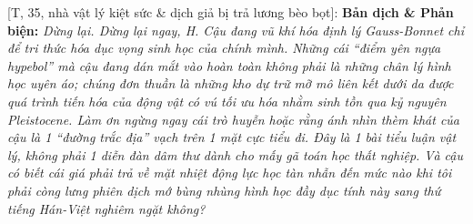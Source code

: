 \documentclass[11pt]{article}
\begin{document}
\vspace{2mm}
\textsf{[T, 35, nhà vật lý kiệt sức \& dịch giả bị trả lương bèo bọt]:} \textbf{Bản dịch \& Phản biện:} \textit{Dừng lại. Dừng lại ngay, H. Cậu đang vũ khí hóa định lý Gauss-Bonnet chỉ để tri thức hóa dục vọng sinh học của chính mình. Những cái ``điểm yên ngựa hypebol'' mà cậu đang dán mắt vào hoàn toàn không phải là những chân lý hình học uyên áo; chúng đơn thuần là những kho dự trữ mỡ mô liên kết dưới da được quá trình tiến hóa của động vật có vú tối ưu hóa nhằm sinh tồn qua kỷ nguyên Pleistocene. Làm ơn ngừng ngay cái trò huyễn hoặc rằng ánh nhìn thèm khát của cậu là 1 ``đường trắc địa'' vạch trên 1 mặt cực tiểu đi. Đây là 1 bài tiểu luận vật lý, không phải 1 diễn đàn dâm thư dành cho mấy gã toán học thất nghiệp. Và cậu có biết cái giá phải trả về mặt nhiệt động lực học tàn nhẫn đến mức nào khi tôi phải còng lưng phiên dịch mớ bùng nhùng hình học đầy dục tính này sang thứ tiếng Hán-Việt nghiêm ngặt không?}
\vspace{2mm}

\end{document}
